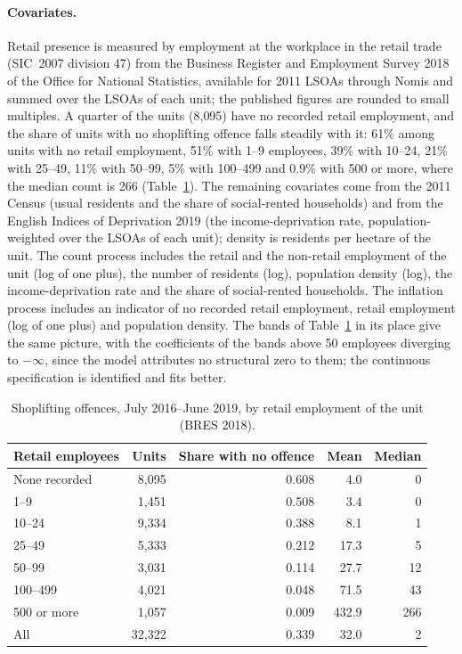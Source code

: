 \paragraph{Covariates.}
Retail presence is measured by employment at the workplace in the retail trade (SIC~2007 division 47) from the Business Register and Employment Survey 2018 of the Office for National Statistics, available for 2011 LSOAs through Nomis and summed over the LSOAs of each unit; the published figures are rounded to small multiples.
A quarter of the units (8{,}095) have no recorded retail employment, and the share of units with no shoplifting offence falls steadily with it: 61\% among units with no retail employment, 51\% with 1--9 employees, 39\% with 10--24, 21\% with 25--49, 11\% with 50--99, 5\% with 100--499 and 0.9\% with 500 or more, where the median count is 266 (Table~\ref{tab:crime_bands}).
The remaining covariates come from the 2011 Census (usual residents and the share of social-rented households) and from the English Indices of Deprivation 2019 (the income-deprivation rate, population-weighted over the LSOAs of each unit); density is residents per hectare of the unit.
The count process includes the retail and the non-retail employment of the unit (log of one plus), the number of residents (log), population density (log), the income-deprivation rate and the share of social-rented households.
The inflation process includes an indicator of no recorded retail employment, retail employment (log of one plus) and population density.
The bands of Table~\ref{tab:crime_bands} in its place give the same picture, with the coefficients of the bands above 50 employees diverging to $-\infty$, since the model attributes no structural zero to them; the continuous specification is identified and fits better.

\begin{table}[htbp]
\centering
\caption{Shoplifting offences, July 2016--June 2019, by retail employment of the unit (BRES 2018).}\label{tab:crime_bands}
\small
\begin{tabular}{lrrrr}
\toprule
Retail employees & Units & Share with no offence & Mean & Median \\
\midrule
None recorded & 8{,}095 & 0.608 & 4.0 & 0 \\
1--9          & 1{,}451 & 0.508 & 3.4 & 0 \\
10--24        & 9{,}334 & 0.388 & 8.1 & 1 \\
25--49        & 5{,}333 & 0.212 & 17.3 & 5 \\
50--99        & 3{,}031 & 0.114 & 27.7 & 12 \\
100--499      & 4{,}021 & 0.048 & 71.5 & 43 \\
500 or more   & 1{,}057 & 0.009 & 432.9 & 266 \\
\midrule
All           & 32{,}322 & 0.339 & 32.0 & 2 \\
\bottomrule
\end{tabular}
\end{table}

